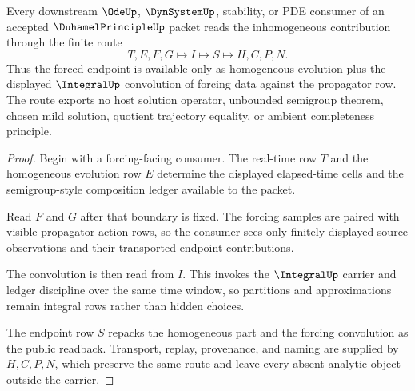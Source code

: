 \begin{theorem}
\label{thm:duhamel-principle-forcing-route}
Every downstream $\OdeUp$, $\DynSystemUp$, stability, or PDE consumer of an accepted $\DuhamelPrincipleUp$ packet reads the inhomogeneous contribution through the finite route
$$
T,E,F,G\longmapsto I\longmapsto S\longmapsto H,C,P,N.
$$
Thus the forced endpoint is available only as homogeneous evolution plus the displayed $\IntegralUp$ convolution of forcing data against the propagator row. The route exports no host solution operator, unbounded semigroup theorem, chosen mild solution, quotient trajectory equality, or ambient completeness principle.
\end{theorem}
\begin{proof}
Begin with a forcing-facing consumer. The real-time row $T$ and the homogeneous evolution row $E$ determine the displayed elapsed-time cells and the semigroup-style composition ledger available to the packet.

Read $F$ and $G$ after that boundary is fixed. The forcing samples are paired with visible propagator action rows, so the consumer sees only finitely displayed source observations and their transported endpoint contributions.

The convolution is then read from $I$. This invokes the $\IntegralUp$ carrier and ledger discipline over the same time window, so partitions and approximations remain integral rows rather than hidden choices.

The endpoint row $S$ repacks the homogeneous part and the forcing convolution as the public readback. Transport, replay, provenance, and naming are supplied by $H,C,P,N$, which preserve the same route and leave every absent analytic object outside the carrier.
\end{proof}


\begin{closurestatus}{\DuhamelPrincipleUp}
  \theoryclosure{\seedClosure}
  \formalstatus{\unformalizedV}
\end{closurestatus}
